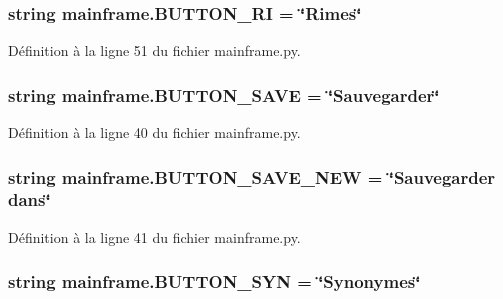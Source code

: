 \subsubsection[{B\+U\+T\+T\+O\+N\+\_\+\+R\+I}]{\setlength{\rightskip}{0pt plus 5cm}string mainframe.\+B\+U\+T\+T\+O\+N\+\_\+\+R\+I = \char`\"{}Rimes\char`\"{}}\label{namespacemainframe_a1245d15496e22d7e584dfc5519082b6e}


Définition à la ligne 51 du fichier mainframe.\+py.

\hypertarget{namespacemainframe_ad0a9c1147be7794e1babbb45c99f4cf5}{}
\subsubsection[{B\+U\+T\+T\+O\+N\+\_\+\+S\+A\+V\+E}]{\setlength{\rightskip}{0pt plus 5cm}string mainframe.\+B\+U\+T\+T\+O\+N\+\_\+\+S\+A\+V\+E = \char`\"{}Sauvegarder\char`\"{}}\label{namespacemainframe_ad0a9c1147be7794e1babbb45c99f4cf5}


Définition à la ligne 40 du fichier mainframe.\+py.

\hypertarget{namespacemainframe_a4650b84570a1374524f0b5fc37ca15c9}{}
\subsubsection[{B\+U\+T\+T\+O\+N\+\_\+\+S\+A\+V\+E\+\_\+\+N\+E\+W}]{\setlength{\rightskip}{0pt plus 5cm}string mainframe.\+B\+U\+T\+T\+O\+N\+\_\+\+S\+A\+V\+E\+\_\+\+N\+E\+W = \char`\"{}Sauvegarder dans\char`\"{}}\label{namespacemainframe_a4650b84570a1374524f0b5fc37ca15c9}


Définition à la ligne 41 du fichier mainframe.\+py.

\hypertarget{namespacemainframe_ade1a54555c9cf39f3f23692edf8995ae}{}
\subsubsection[{B\+U\+T\+T\+O\+N\+\_\+\+S\+Y\+N}]{\setlength{\rightskip}{0pt plus 5cm}string mainframe.\+B\+U\+T\+T\+O\+N\+\_\+\+S\+Y\+N = \char`\"{}Synonymes\char`\"{}}\label{namespacemainframe_ade1a54555c9cf39f3f23692edf8995ae}


